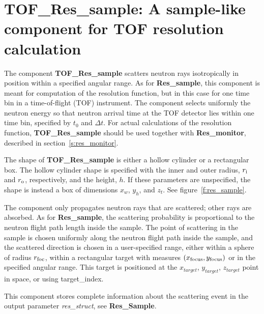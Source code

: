 
\section{TOF\_Res\_sample: A sample-like component for TOF resolution calculation}
\label{s:tof_res_sample}


The component \textbf{TOF\_Res\_sample} scatters neutron rays isotropically
in position within a specified angular range. 
As for {\bf Res\_sample}, this component is meant
for computation of the resolution function, but in this case for one time bin in a
time-of-flight (TOF) instrument. The component selects uniformly the neutron 
energy so that neutron arrival time at the TOF detector lies within one time bin,
specified by $t_0$ and $\Delta t$.
For actual calculations of the resolution
function, {\bf TOF\_Res\_sample} should be used
together with \textbf{Res\_monitor}, described in
section~\ref{s:res_monitor}.

The shape of {\bf TOF\_Res\_sample} is either a hollow cylinder
or a rectangular box. 
The hollow cylinder shape is
specified with the inner and outer radius, $r_{\rm i}$ and $r_{\rm o}$,
respectively, and the height, $h$.
If these parameters are unspecified,
the shape is instead a box of dimensions $x_w$, $y_h$, and $z_t$.
See figure~\ref{f:res_sample}.\par

The component only propagates neutron rays that are scattered; 
other rays are absorbed. 
As for {\bf Res\_sample}, the scattering probability is proportional to the neutron
flight path length inside the sample.
The point of scattering in the sample is chosen uniformly
along the neutron flight path inside the sample, and the scattered
direction is chosen in a user-specified range,
either within a sphere of radius $r_{\rm foc}$, within a rectangular
target with measures $(x_{\rm focus}, y_{\rm focus})$
or in the specified angular range. 
This target is positioned at the $x_{target}$, $y_{target}$, $z_{target}$ 
point in space, or using target\_index.

This component stores complete information about the scattering event in the
output parameter \textit{res\_struct}, see {\bf Res\_Sample}. 
